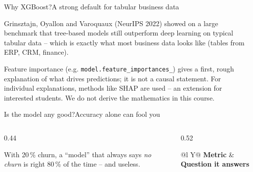 \documentclass[aspectratio=169,11pt]{beamer}
\begin{document}
\begin{frame}{Why XGBoost?}{A strong default for tabular business data}
{  Grinsztajn, Oyallon and Varoquaux (NeurIPS 2022) showed on a large benchmark that tree-based models still outperform deep learning on typical tabular data -- which is exactly what most business data looks like (tables from ERP, CRM, finance).\par
  Feature importance (e.g. \texttt{model.feature\_importances\_}) gives a first, rough explanation of what drives predictions; it is not a causal statement. For individual explanations, methods like SHAP are used -- an extension for interested students. We do not derive the mathematics in this course.}
\end{frame}

\begin{frame}{Is the model any good?}{Accuracy alone can fool you}
  \vspace{2pt}
  \begin{columns}[T]
    \begin{column}{0.44\textwidth}
      \begin{badbox}
        With 20\,\% churn, a ``model'' that always says \emph{no churn} is right 80\,\% of the time -- and useless.
      \end{badbox}
      \centering
    \end{column}
    \begin{column}{0.52\textwidth}
      {\footnotesize
      \renewcommand{\arraystretch}{1.25}
      \begin{tabularx}{\linewidth}{@{}l Y@{}}
        \toprule
        \textbf{Metric} & \textbf{Question it answers}\\

\end{tabularx}}
\end{column}
\end{columns}
\end{frame}
\end{document}
